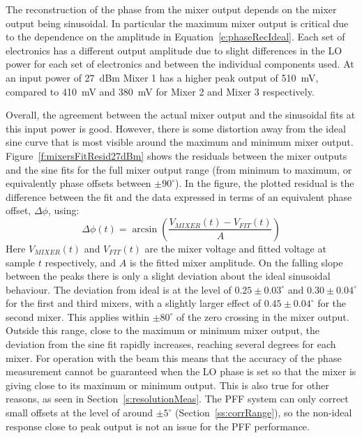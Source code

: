 The reconstruction of the phase from the mixer output depends on the mixer output being sinusoidal. In particular the maximum mixer output is critical due to the dependence on the amplitude in Equation~\ref{e:phaseRecIdeal}. Each set of electronics has a different output amplitude due to slight differences in the LO power for each set of electronics and between the individual components used. At an input power of 27~dBm Mixer 1 has a higher peak output of 510~mV, compared to 410~mV and 380~mV for Mixer 2 and Mixer 3 respectively. 

Overall, the agreement between the actual mixer output and the sinusoidal fits at this input power is good. However, there is some distortion away from the ideal sine curve that is most visible around the maximum and minimum mixer output. Figure~\ref{f:mixersFitResid27dBm} shows the residuals between the mixer outputs and the sine fits for the full mixer output range (from minimum to maximum, or equivalently phase offsets between \(\pm90^\circ\)). In the figure, the plotted residual is the difference between the fit and the data expressed in terms of an equivalent phase offset, \(\Delta \phi\), using:
\begin{equation}
\Delta \phi(t) = \arcsin\left(\frac{V_{MIXER}(t)-V_{FIT}(t)}{A}\right)
\end{equation}
Here \(V_{MIXER}(t)\) and \(V_{FIT}(t)\) are the mixer voltage and fitted voltage at sample \(t\) respectively, and \(A\) is the fitted mixer amplitude. On the falling slope between the peaks there is only a slight deviation about the ideal sinusoidal behaviour. The deviation from ideal is at the level of \(0.25\pm0.03^\circ\) and \(0.30\pm0.04^\circ\) for the first and third mixers, with a slightly larger effect of \(0.45\pm0.04^\circ\) for the second mixer. This applies within \(\pm80^\circ\) of the zero crossing in the mixer output. Outside this range, close to the maximum or minimum mixer output, the deviation from the sine fit rapidly increases, reaching several degrees for each mixer. For operation with the beam this means that the accuracy of the phase measurement cannot be guaranteed when the LO phase is set so that the mixer is giving close to its maximum or minimum output. This is also true for other reasons, as seen in Section~\ref{s:resolutionMeas}. The PFF system can only correct small offsets at the level of around \(\pm5^\circ\) (Section~\ref{ss:corrRange}), so the non-ideal response close to peak output is not an issue for the PFF performance.

